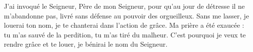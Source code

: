 J’ai invoqué le Seigneur, Père de mon Seigneur,
	pour qu’au jour de détresse il ne m’abandonne pas,
	livré sans défense au pouvoir des orgueilleux.
Sans me lasser, je louerai ton nom,
	je te chanterai dans l’action de grâce.
Ma prière a été exaucée :
	tu m’as sauvé de la perdition, tu m’as tiré du malheur.
C’est pourquoi je veux te rendre grâce et te louer,
	je bénirai le nom du Seigneur.
